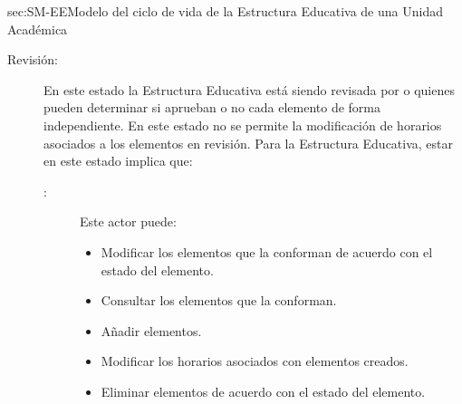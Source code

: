 \begin{Maquina}{sec:SM-EE}{Modelo del ciclo de vida de la Estructura Educativa de una Unidad Académica}
\begin{description}
\item[Revisión:] En este estado la Estructura Educativa está siendo revisada por  o  quienes pueden determinar si aprueban o no cada elemento de forma independiente. En este estado no se permite la modificación de horarios asociados a los elementos en revisión. Para la Estructura Educativa, estar en este estado implica que:%
%	


\begin{description}
	\item[:] Este actor puede:%
	\begin{itemize} 
		\item Modificar los elementos que la conforman de acuerdo con el estado del elemento.
		\item Consultar los elementos que la conforman.
		\item Añadir elementos.
		\item Modificar los horarios asociados con elementos creados.
		\item Eliminar elementos de acuerdo con el estado del elemento.
	\end{itemize}
	

\end{description}
\end{description}
\end{Maquina}
